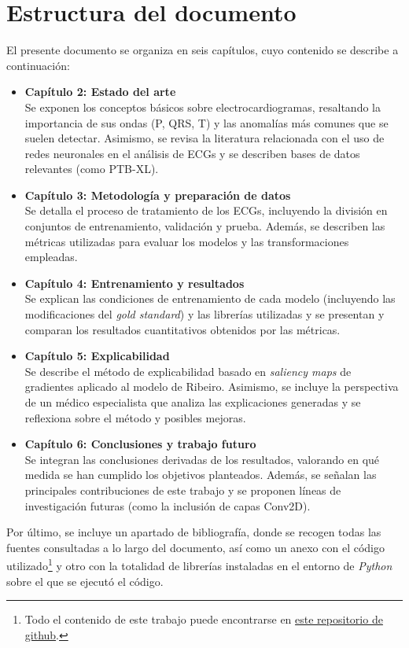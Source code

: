 \section{Estructura del documento}
El presente documento se organiza en seis capítulos, cuyo contenido se describe a continuación:
\begin{itemize}
	\item \textbf{Capítulo 2: Estado del arte} \\
	Se exponen los conceptos básicos sobre electrocardiogramas, resaltando la importancia de sus ondas (P, QRS, T) y las anomalías más comunes que se suelen detectar. Asimismo, se revisa la literatura relacionada con el uso de redes neuronales en el análisis de ECGs y se describen bases de datos relevantes (como PTB-XL).
	
	\item  \textbf{Capítulo 3: Metodología y preparación de datos} \\
	Se detalla el proceso de tratamiento de los ECGs, incluyendo la división en conjuntos de entrenamiento, validación y prueba. Además, se describen las métricas utilizadas para evaluar los modelos y las transformaciones empleadas.
	
	\item \textbf{Capítulo 4: Entrenamiento y resultados}\\
	Se explican las condiciones de entrenamiento de cada modelo (incluyendo las modificaciones del \emph{gold standard}) y las librerías utilizadas y se presentan y comparan los resultados cuantitativos obtenidos por las métricas.
	
	\item \textbf{Capítulo 5: Explicabilidad}\\
	Se describe el método de explicabilidad basado en \emph{saliency maps} de gradientes aplicado al modelo de Ribeiro. Asimismo, se incluye la perspectiva de un médico especialista que analiza las explicaciones generadas y se reflexiona sobre el método y posibles mejoras.
	
	\item \textbf{Capítulo 6: Conclusiones y trabajo futuro}\\
	Se integran las conclusiones derivadas de los resultados, valorando en qué medida se han cumplido los objetivos planteados. Además, se señalan las principales contribuciones de este trabajo y se proponen líneas de investigación futuras (como la inclusión de capas Conv2D).
\end{itemize}

Por último, se incluye un apartado de bibliografía, donde se recogen todas las fuentes consultadas a lo largo del documento, así como un anexo con el código utilizado\footnote{Todo el contenido de este trabajo puede encontrarse en \href{https://github.com/NotNoe/TFG-Info}{este repositorio de github}.} y otro con la totalidad de librerías instaladas en el entorno de \emph{Python} sobre el que se ejecutó el código.
